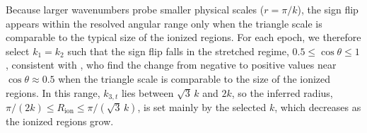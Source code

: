 \documentclass[apj,twocolumn, appendixfloats, twocolappendix, numberedappendix, tighten]{openjournal}
\begin{document}
Because larger wavenumbers probe smaller physical scales ($r = \pi/k$), the sign flip appears within the resolved angular range only when the triangle scale is comparable to the typical size of the ionized regions. For each epoch, we therefore select $k_1 = k_2$ such that the sign flip falls in the stretched regime, $0.5 \leq \cos\theta \leq 1$, consistent with \citet{Hutter2020a}, who find the change from negative to positive values near $\cos\theta \approx 0.5$ when the triangle scale is comparable to the size of the ionized regions. In this range, $k_{3,t}$ lies between $\sqrt{3}\,k$ and $2k$, so the inferred radius, $\pi/(2k) \leq R_\mathrm{ion} \leq \pi/(\sqrt{3}\,k)$, is set mainly by the selected $k$, which decreases as the ionized regions grow.


\end{document}
